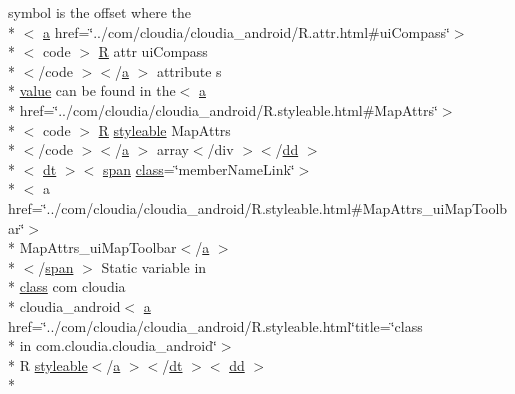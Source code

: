\begin{DoxyCompactItemize}
symbol is the offset where the\\*
$<$ \hyperlink{style_8css_a5e8981582017bb8b84c21f148345d1f7}{a} href=\char`\"{}../com/cloudia/cloudia\-\_\-android/R.\-attr.\-html\#ui\-Compass\char`\"{}$>$\\*
$<$ code $>$ \hyperlink{index-16_8html_a31e8fe59be5c20ce90a0090e28a0c1fe}{R} attr ui\-Compass\\*
$<$/code $>$$<$/\hyperlink{style_8css_a5e8981582017bb8b84c21f148345d1f7}{a} $>$ attribute s \\*
\hyperlink{_my_s_q_l_connector_8measure_8html_afcc7a4b78ecd8fa7e713f8cfa0f51017}{value} can be found in the$<$ \hyperlink{style_8css_a5e8981582017bb8b84c21f148345d1f7}{a} \\*
href=\char`\"{}../com/cloudia/cloudia\-\_\-android/R.\-styleable.\-html\#Map\-Attrs\char`\"{}$>$\\*
$<$ code $>$ \hyperlink{index-16_8html_a31e8fe59be5c20ce90a0090e28a0c1fe}{R} \hyperlink{index-17_8html_ae6c9bf1e41380184b4b665ca9ab6ba0a}{styleable} Map\-Attrs\\*
$<$/code $>$$<$/\hyperlink{style_8css_a5e8981582017bb8b84c21f148345d1f7}{a} $>$ array$<$/div $>$$<$/\hyperlink{stylesheet_8css_a47f4718a86835a7771ec592ece845221}{dd} $>$\\*
$<$ \hyperlink{stylesheet_8css_a107565fb4039d33b041380d6e0ea1d80}{dt} $>$$<$ \hyperlink{stylesheet_8css_a8343996ebcf16220b04e54659aac31cc}{span} \hyperlink{_tools_8html_acf06f836132665ba8114f5a414c2403f}{class}=\char`\"{}member\-Name\-Link\char`\"{}$>$\\*
$<$ a href=\char`\"{}../com/cloudia/cloudia\-\_\-android/R.\-styleable.\-html\#Map\-Attrs\-\_\-ui\-Map\-Toolbar\char`\"{}$>$\\*
 Map\-Attrs\-\_\-ui\-Map\-Toolbar$<$/\hyperlink{style_8css_a5e8981582017bb8b84c21f148345d1f7}{a} $>$\\*
$<$/\hyperlink{stylesheet_8css_a8343996ebcf16220b04e54659aac31cc}{span} $>$ Static variable in \\*
\hyperlink{_tools_8html_acf06f836132665ba8114f5a414c2403f}{class} com cloudia \\*
cloudia\-\_\-android$<$ \hyperlink{style_8css_a5e8981582017bb8b84c21f148345d1f7}{a} href=\char`\"{}../com/cloudia/cloudia\-\_\-android/R.\-styleable.\-html\char`\"{}title=\char`\"{}class \\*
in com.\-cloudia.\-cloudia\-\_\-android\char`\"{}$>$\\*
 R \hyperlink{index-17_8html_ae6c9bf1e41380184b4b665ca9ab6ba0a}{styleable}$<$/\hyperlink{style_8css_a5e8981582017bb8b84c21f148345d1f7}{a} $>$$<$/\hyperlink{stylesheet_8css_a107565fb4039d33b041380d6e0ea1d80}{dt} $>$$<$ \hyperlink{stylesheet_8css_a47f4718a86835a7771ec592ece845221}{dd} $>$\\*

\end{DoxyCompactItemize}
